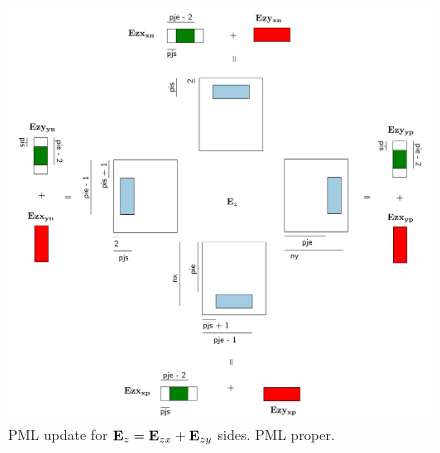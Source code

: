 \documentclass[a4paper,12pt]{article}
\begin{document}
%
\begin{figure}
\centering
\includegraphics[width=1\textwidth]{../pics/tikz/svg/pml-color/Ex-plus-Ey-long.pdf}
\caption{PML update for ${\bf E}_z = {\bf E}_{zx} + {\bf E}_{zy}$ sides. PML proper.}
\end{figure}
%
%
\end{document}
